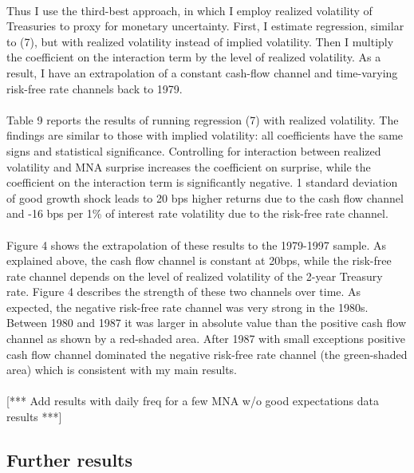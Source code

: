 \documentclass[12pt]{article}
\begin{document}
\paragraph{}
Thus I use the third-best approach, in which I employ realized volatility of Treasuries to proxy for monetary uncertainty. First, I estimate regression, similar to (7), but with realized volatility instead of implied volatility. Then I multiply the coefficient on the interaction term by the level of realized volatility. As a result, I have an extrapolation of a constant cash-flow channel and time-varying risk-free rate channels back to 1979.
\paragraph{}
Table 9 reports the results of running regression (7) with realized volatility. The findings are similar to those with implied volatility: all coefficients have the same signs and statistical significance. Controlling for interaction between realized volatility and MNA surprise increases the coefficient on surprise, while the coefficient on the interaction term is significantly negative. 1 standard deviation of good growth shock leads to 20 bps higher returns due to the cash flow channel and -16 bps per 1\% of interest rate volatility due to the risk-free rate channel. 
\paragraph{}
Figure 4 shows the extrapolation of these results to the 1979-1997 sample. As explained above, the cash flow channel is constant at 20bps, while the risk-free rate channel depends on the level of realized volatility of the 2-year Treasury rate. Figure 4 describes the strength of these two channels over time. As expected, the negative risk-free rate channel was very strong in the 1980s. Between 1980 and 1987 it was larger in absolute value than the positive cash flow channel as shown by a red-shaded area. After 1987 with small exceptions positive cash flow channel dominated the negative risk-free rate channel (the green-shaded area) which is consistent with my main results.
\paragraph{}
[*** Add results with daily freq for a few MNA w/o good expectations data results ***]

\subsection{Further results} 
\label{sec:Model}
\end{document}
